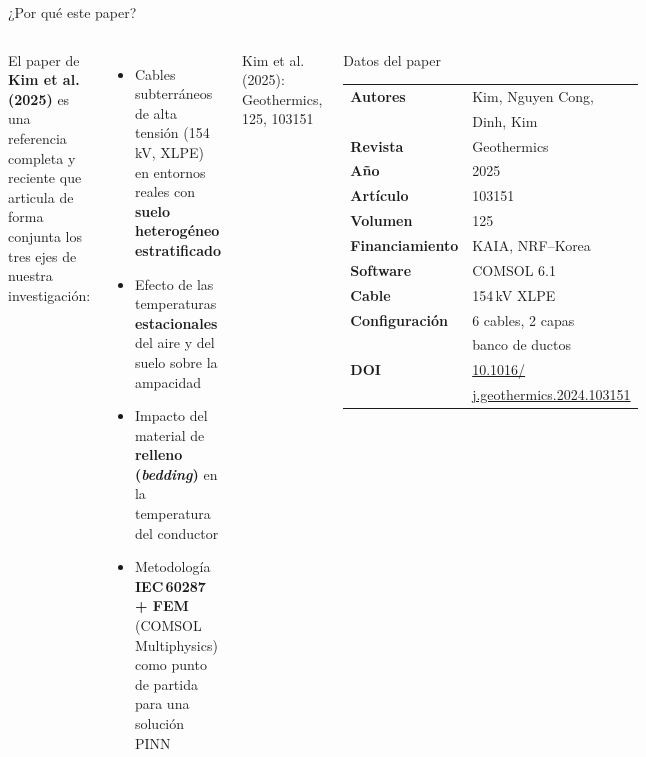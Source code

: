 \documentclass[aspectratio=169]{beamer}
\newcommand{\refcite}[1]{{\footnotesize\color{gray!70!black} #1}}
\begin{document}
\begin{frame}{¿Por qué este paper?}
\begin{columns}[T]
\justifying\small
El paper de \textbf{Kim et al. (2025)} es una referencia completa y
reciente que articula de forma conjunta los tres ejes de nuestra
investigación:

\vspace{0.5em}
\begin{itemize}[leftmargin=*, itemsep=3pt]\small
  \item Cables subterráneos de alta tensión (154\,kV, XLPE) en entornos
        reales con \textbf{suelo heterogéneo estratificado}
  \item Efecto de las temperaturas \textbf{estacionales} del aire y del
        suelo sobre la ampacidad
  \item Impacto del material de \textbf{relleno (\textit{bedding})} en la
        temperatura del conductor
  \item Metodología \textbf{IEC\,60287 + FEM} (COMSOL Multiphysics)
        como punto de partida para una solución PINN
\end{itemize}

\vspace{0.5em}
\refcite{Kim et al. (2025): Geothermics, 125, 103151}

\begin{block}{\small Datos del paper}
\scriptsize
\begin{tabular}{@{}ll@{}}
\textbf{Autores} & Kim, Nguyen Cong,\\
                 & Dinh, Kim\\
\textbf{Revista} & Geothermics\\
\textbf{Año} & 2025\\
\textbf{Artículo} & 103151\\
\textbf{Volumen} & 125\\
\textbf{Financiamiento} & KAIA, NRF--Korea\\
\textbf{Software} & COMSOL 6.1\\
\textbf{Cable} & 154\,kV XLPE\\
\textbf{Configuración} & 6 cables, 2 capas\\
                       & banco de ductos\\
\textbf{DOI} & \href{https://doi.org/10.1016/}{10.1016/}\\
             & \href{https://doi.org/10.1016/j.geothermics.2024.103151}{j.geothermics.2024.103151}\\
\end{tabular}
\end{block}
\end{columns}
\end{frame}
\end{document}
